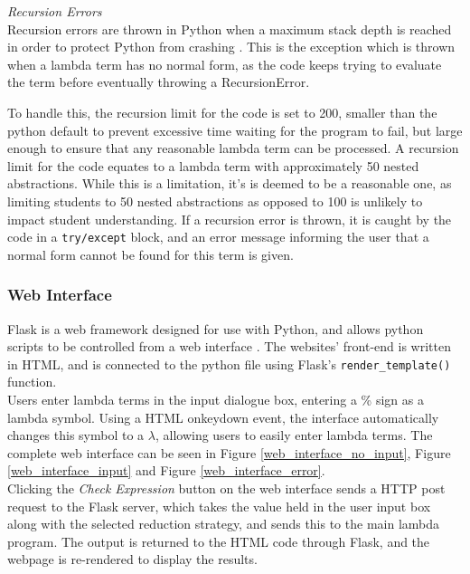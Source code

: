 \documentclass[a4paper,11pt]{report}
\begin{document}
\textit{Recursion Errors}\\
Recursion errors are thrown in Python when a maximum stack depth is reached in order to protect Python from crashing \cite{PythonStack2019}. This is the exception which is thrown when a lambda term has no normal form, as the code keeps trying to evaluate the term before eventually throwing a RecursionError.

To handle this, the recursion limit for the code is set to 200, smaller than the python default to prevent excessive time waiting for the program to fail, but large enough to ensure that any reasonable lambda term can be processed. A recursion limit for the code equates to a lambda term with approximately 50 nested abstractions. While this is a limitation, it's is deemed to be a reasonable one, as limiting students to 50 nested abstractions as opposed to 100 is unlikely to impact student understanding. If a recursion error is thrown, it is caught by the code in a \texttt{try/except} block, and an error message informing the user that a normal form cannot be found for this term is given.

\subsubsection{Web Interface}

Flask is a web framework designed for use with Python, and allows python scripts to be controlled from a web interface \cite{FullStack2019}. The websites' front-end is written in HTML, and is connected to the python file using Flask's \texttt{render_template()} function.\\

Users enter lambda terms in the input dialogue box, entering a \% sign as a lambda symbol. Using a HTML onkeydown event, the interface automatically changes this symbol to a $\lambda$, allowing users to easily enter lambda terms. The complete web interface can be seen in Figure \ref{web_interface_no_input}, Figure \ref{web_interface_input} and Figure \ref{web_interface_error}.\\

Clicking the \textit{Check Expression} button on the web interface sends a HTTP post request to the Flask server, which takes the value held in the user input box along with the selected reduction strategy, and sends this to the main lambda program. The output is returned to the HTML code through Flask, and the webpage is re-rendered to display the results.
\end{document}
